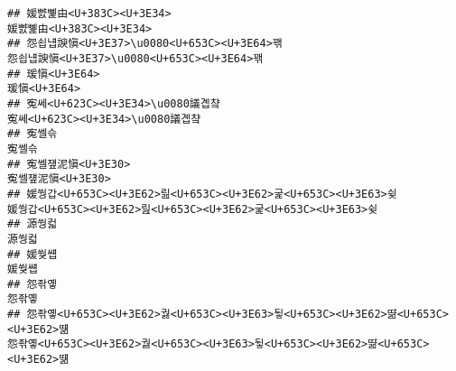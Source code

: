 \documentclass[]{article}
\begin{document}
\begin{verbatim}
## 媛뺤뼱由<U+383C><U+3E34>                                                                                                                                                                                         媛뺤뼱由<U+383C><U+3E34>
## 怨쇱냽諛愼<U+3E37>\u0080<U+653C><U+3E64>꽦                                                                                                                                                           怨쇱냽諛愼<U+3E37>\u0080<U+653C><U+3E64>꽦
## 瑗愼<U+3E64>                                                                                                                                                                                                           瑗愼<U+3E64>
## 寃쎄<U+623C><U+3E34>\u0080議곕챸                                                                                                                                                                         寃쎄<U+623C><U+3E34>\u0080議곕챸
## 寃쎌슦                                                                                                                                                                                                                 寃쎌슦
## 寃쎌쟾泥愼<U+3E30>                                                                                                                                                                                               寃쎌쟾泥愼<U+3E30>
## 媛쒕갑<U+653C><U+3E62>릺<U+653C><U+3E62>굹<U+653C><U+3E63>슂                                                                                                                                         媛쒕갑<U+653C><U+3E62>릺<U+653C><U+3E62>굹<U+653C><U+3E63>슂
## 源쒕컯                                                                                                                                                                                                                 源쒕컯
## 媛쒖썝                                                                                                                                                                                                                 媛쒖썝
## 怨좎옣                                                                                                                                                                                                                 怨좎옣
## 怨좎옣<U+653C><U+3E62>궗<U+653C><U+3E63>뒿<U+653C><U+3E62>땲<U+653C><U+3E62>떎                                                                                                                 怨좎옣<U+653C><U+3E62>궗<U+653C><U+3E63>뒿<U+653C><U+3E62>땲<U+653C><U+3E62>떎

\end{verbatim}
\end{document}
